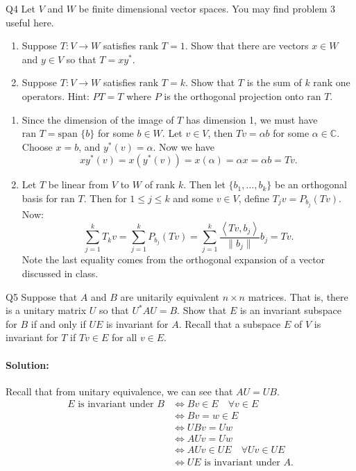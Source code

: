 \documentclass{article}
\begin{document}
\begin{prob}{Q4}
Let $V$ and $W$ be finite dimensional vector spaces. You may find problem 3 useful here.
\begin{enumerate}[label= (\alph*)] 
    \item Suppose $T: V \to W$ satisfies $\text{rank } T = 1$. Show that there are vectors $x \in W$ and $y \in V$ so that $T = xy^*$.
    \item Suppose $T: V \to W$ satisfies $\text{rank } T = k$. Show that $T$ is the sum of $k$ rank one operators. Hint: $PT = T$ where $P$ is the orthogonal projection onto $\text{ran } T$.
\end{enumerate}
\end{prob}
\begin{enumerate}[label= (\alph*)] 
    \item Since the dimension of the image of $T$ has dimension 1, we must have $\text{ran }T=\text{span }\{b\} $ for some $b\in W$. Let $v\in V$, then $Tv=\alpha b$ for some $\alpha\in \mathbb{C}$. Choose $x=b$, and $y^*(v)=\alpha$. Now we have 
        \[
        xy^* (v)=x(y^* (v))=x(\alpha)=\alpha x=\alpha b= Tv
        .\] 

    \item Let $T$ be linear from $V$ to $W$ of rank $k$. Then let $\{b_1,\ldots,b_k\} $ be an orthogonal basis for $\text{ran }T$. Then for $1\leq j\leq k$ and some $v\in V$, define $T_jv=P_{b_j}(Tv)$. Now:
        \[
            \sum_{j=1}^{k} T_k v=\sum_{j=1}^{k} P_{b_j}(Tv)=\sum_{j=1}^{k} \frac{\left<Tv,b_j \right>}{\|b_j\|}b_j=Tv
        .\] 
        Note the last equality comes from the orthogonal expansion of a vector discussed in class.
\end{enumerate}

\begin{prob}{Q5}
Suppose that $A$ and $B$ are unitarily equivalent $n \times n$ matrices. That is, there is a unitary matrix $U$ so that $U^*AU = B$. Show that $E$ is an invariant subspace for $B$ if and only if $UE$ is invariant for $A$.
Recall that a subspace $E$ of $V$ is invariant for $T$ if $Tv \in E$ for all $v \in E$.
\end{prob}
\paragraph{Solution: }Recall that from unitary equivalence, we can see that $AU=UB$.
\begin{align*}
    E \text{ is invariant under }B&\iff Bv\in E\quad\forall v\in E\\
                        &\iff Bv=w\in E\\
                         &\iff UBv=Uw\\
                         &\iff AUv=Uw\\
                         &\iff AUv\in UE\quad \forall Uv\in UE\\
                         &\iff  UE \text{ is invariant under } A
.\end{align*}
\end{document}
